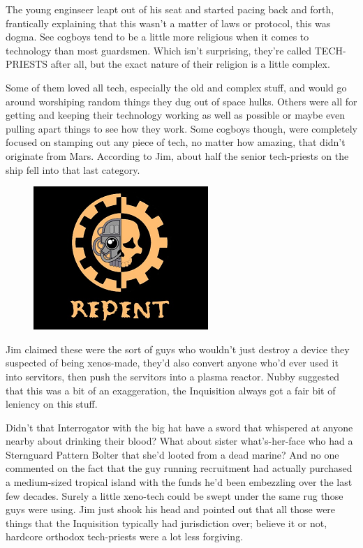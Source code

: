The young enginseer leapt out of his seat and started pacing back and forth, frantically explaining that this wasn't a matter of laws or protocol, this was dogma. 
See cogboys tend to be a little more religious when it comes to technology than most guardsmen. 
Which isn't surprising, they're called TECH-PRIESTS after all, but the exact nature of their religion is a little complex. 


Some of them loved all tech, especially the old and complex stuff, and would go around worshiping random things they dug out of space hulks. 
Others were all for getting and keeping their technology working as well as possible or maybe even pulling apart things to see how they work. 
Some cogboys though, were completely focused on stamping out any piece of tech, no matter how amazing, that didn't originate from Mars. 
According to Jim, about half the senior tech-priests on the ship fell into that last category.

\begin{figure}
	\begin{center}
		\includegraphics[width=\figwidth]{pics/11/5.png}
	\end{center}
\end{figure}
Jim claimed these were the sort of guys who wouldn't just destroy a device they suspected of being xenos-made, they'd also convert anyone who'd ever used it into servitors, then push the servitors into a plasma reactor. 
Nubby suggested that this was a bit of an exaggeration, the Inquisition always got a fair bit of leniency on this stuff. 


Didn't that Interrogator with the big hat have a sword that whispered at anyone nearby about drinking their blood? 
What about sister what's-her-face who had a Sternguard Pattern Bolter that she'd looted from a dead marine? 
And no one commented on the fact that the guy running recruitment had actually purchased a medium-sized tropical island with the funds he'd been embezzling over the last few decades. 
Surely a little xeno-tech could be swept under the same rug those guys were using. 
Jim just shook his head and pointed out that all those were things that the Inquisition typically had jurisdiction over; 
believe it or not, hardcore orthodox tech-priests were a lot less forgiving.

